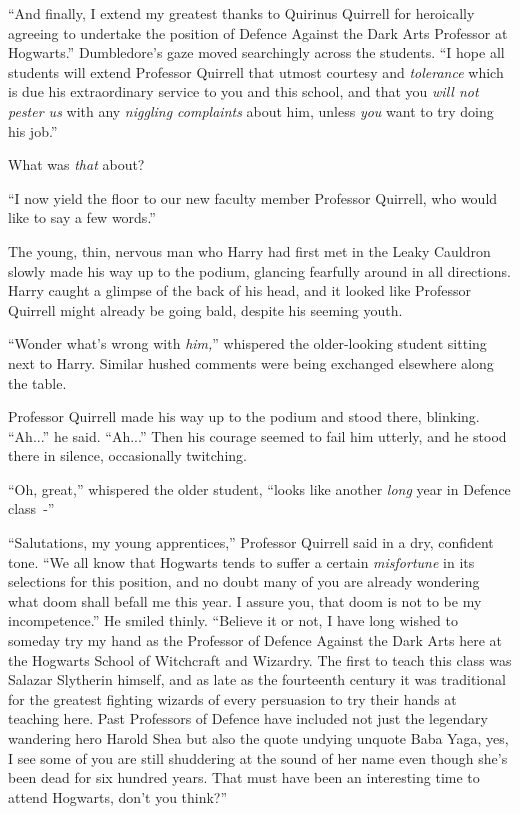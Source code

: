 ``And finally, I extend my greatest thanks to Quirinus Quirrell for heroically agreeing to undertake the position of Defence Against the Dark Arts Professor at Hogwarts.'' Dumbledore's gaze moved searchingly across the students. ``I hope all students will extend Professor Quirrell that utmost courtesy and \emph{tolerance} which is due his extraordinary service to you and this school, and that you \emph{will not pester us} with any \emph{niggling complaints} about him, unless \emph{you} want to try doing his job.''

What was \emph{that} about?

``I now yield the floor to our new faculty member Professor Quirrell, who would like to say a few words.''

The young, thin, nervous man who Harry had first met in the Leaky Cauldron slowly made his way up to the podium, glancing fearfully around in all directions. Harry caught a glimpse of the back of his head, and it looked like Professor Quirrell might already be going bald, despite his seeming youth.

``Wonder what's wrong with \emph{him,}'' whispered the older-looking student sitting next to Harry. Similar hushed comments were being exchanged elsewhere along the table.

Professor Quirrell made his way up to the podium and stood there, blinking. ``Ah...'' he said. ``Ah...'' Then his courage seemed to fail him utterly, and he stood there in silence, occasionally twitching.

``Oh, great,'' whispered the older student, ``looks like another \emph{long} year in Defence class~-''

``Salutations, my young apprentices,'' Professor Quirrell said in a dry, confident tone. ``We all know that Hogwarts tends to suffer a certain \emph{misfortune} in its selections for this position, and no doubt many of you are already wondering what doom shall befall me this year. I assure you, that doom is not to be my incompetence.'' He smiled thinly. ``Believe it or not, I have long wished to someday try my hand as the Professor of Defence Against the Dark Arts here at the Hogwarts School of Witchcraft and Wizardry. The first to teach this class was Salazar Slytherin himself, and as late as the fourteenth century it was traditional for the greatest fighting wizards of every persuasion to try their hands at teaching here. Past Professors of Defence have included not just the legendary wandering hero Harold Shea but also the quote undying unquote Baba Yaga, yes, I see some of you are still shuddering at the sound of her name even though she's been dead for six hundred years. That must have been an interesting time to attend Hogwarts, don't you think?''

